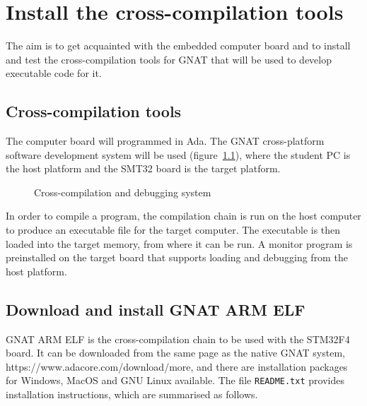 \chapter{Install the cross-compilation tools}\label{ch:Assignment2}

The aim is to get acquainted with the embedded computer board and to install and test the cross-compilation tools for GNAT that will be used to develop executable code for it.

\section{Cross-compilation tools}

The computer board will programmed in Ada. The GNAT cross-platform software development system will be used (figure~\ref{fig:cross}), where the student PC is the host platform and the SMT32 board is the target platform.

\begin{figure}[h]
            \caption{Cross-compilation and debugging system}
            \label{fig:cross}
\end{figure}

In order to compile a program, the compilation chain is run on the host computer to produce an executable file for the target computer. The executable is then loaded into the target memory, from where it can be run. A monitor program is preinstalled on the target board that supports loading and debugging from the host platform.

\section{Download and install GNAT ARM ELF}

GNAT ARM ELF is the cross-compilation chain to be used with the STM32F4 board. It can be downloaded from the same page as the native GNAT system, https://www.adacore.com/download/more, and there are installation packages for Windows, MacOS and GNU Linux available. The file {\tt README.txt} provides installation instructions, which are summarised as follows.
